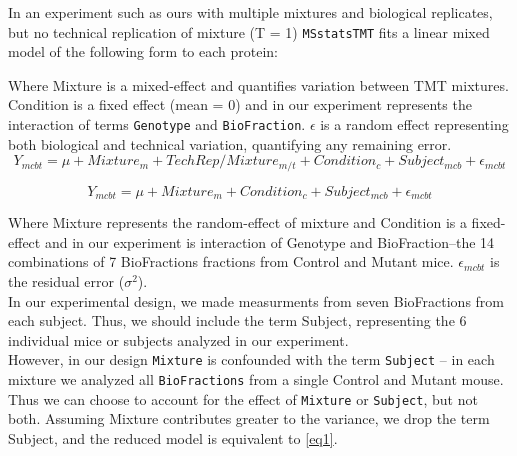 \documentclass[11pt]{elife}\usepackage[]{graphicx}\usepackage[]{color}
\begin{document}
In an experiment such as ours with multiple mixtures and biological replicates, 
but no technical replication of mixture (T = 1) \texttt{MSstatsTMT} fits a
linear mixed model of the following form to each protein:

Where Mixture is a mixed-effect and quantifies variation between TMT mixtures.
Condition is a fixed effect (mean = 0) and in our experiment represents the
interaction of terms \texttt{Genotype} and \texttt{BioFraction}. $\epsilon$ 
is a random effect representing both biological and technical variation, 
quantifying any remaining error. \\

\begin{equation} \label{eq1}
	Y_{mcbt} = \mu + Mixture_m + TechRep/Mixture_{m/t} + Condition_c + 
	Subject_{mcb} + \epsilon_{mcbt}
\end{equation}

%



\begin{equation} \label{eq2}
	Y_{mcbt} = \mu + Mixture_m + Condition_c + Subject_{mcb} + \epsilon_{mcbt}
\end{equation}

Where Mixture represents the random-effect of mixture and 
Condition is a fixed-effect and in our experiment is interaction of 
Genotype and BioFraction--the 14 combinations of 7 BioFractions fractions from 
Control and Mutant mice. $\epsilon_{mcbt}$ is the residual error ($\sigma^2$).\\

In our experimental design, we made measurments from seven BioFractions 
from each subject. Thus, we should include the term 
Subject, representing the 6 individual mice or subjects analyzed in our 
experiment. \\


However, in our design \texttt{Mixture} is confounded with the
term \texttt{Subject} -- in each mixture we analyzed all \texttt{BioFractions} 
from a single Control and Mutant mouse. Thus we can choose to account for the 
effect of \texttt{Mixture} or \texttt{Subject}, but not both. 
Assuming Mixture contributes greater to the variance, we drop the term Subject,
and the reduced model is equivalent  to \ref{eq1}. \\
\end{document}
